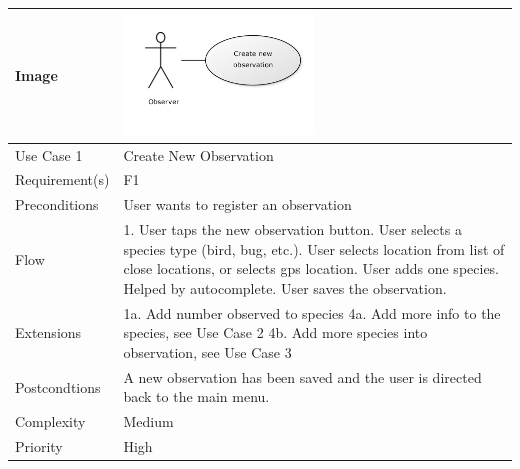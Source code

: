 \begin{tabular}[t]{|l|p{}|}\hline
	Image&\includegraphics[width=0.5\textwidth]{reqspec/uc/cno.png} \\\hline
	Use Case 1&Create New Observation\\\hline
	Requirement(s)&F1\\\hline
	Preconditions&User wants to register an observation\\\hline
	Flow&1. User taps the new observation button\newline
	2. User selects a species type (bird, bug, etc.)\newline
	3. User selects location from list of close locations, or selects gps location\newline
	4. User adds one species. Helped by autocomplete\newline
	5. User saves the observation.\\\hline
	Extensions& 1a. Add number observed to species\newline
	4a. Add more info to the species, see Use Case 2\newline
	4b. Add more species into observation, see Use Case 3\\\hline
	Postcondtions&A new observation has been saved and the user is directed back to the main menu.\\\hline
	Complexity&Medium\\\hline
	Priority&High\\\hline
\end{tabular}

\hspace{4em}

